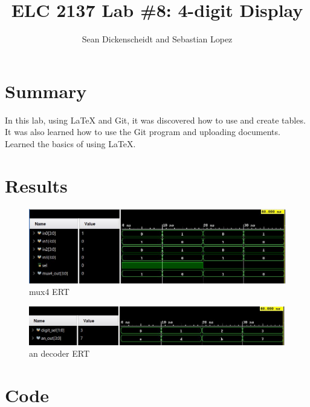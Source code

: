 \documentclass[11pt]{article}
\begin{document}
\title{ELC 2137 Lab \#8: 4-digit Display}
\author{Sean Dickenscheidt and Sebastian Lopez}

\maketitle


\section*{Summary}

In this lab, using LaTeX and Git, it was discovered how to use and create tables. It was also learned how to use the Git program and uploading documents. Learned the basics of using LaTeX.






\section*{Results}

\begin{figure}[ht]\centering
	
	
	\includegraphics[width=1\textwidth]{mux4.JPG}
	\caption{mux4 ERT}
	\label{fig:sim_with_table}
	
\end{figure}
\begin{figure}[ht]\centering
	

	
	\includegraphics[width=1\textwidth]{an_test.JPG}
	\caption{an decoder ERT}
	\label{fig:sim_with_table}

\end{figure}


\clearpage
\section*{Code}
\end{document}
